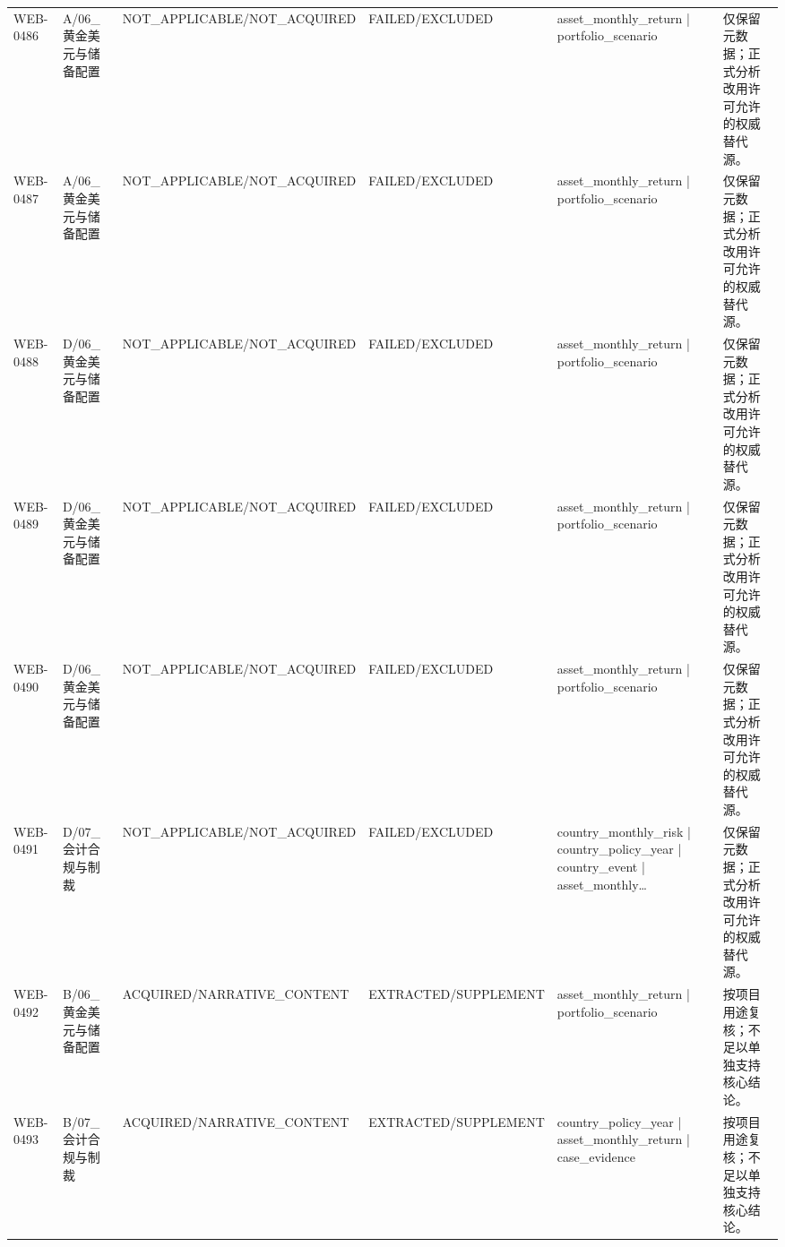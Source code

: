 \begin{landscape}
\begin{longtable}{p{1.8cm}p{2.6cm}p{2.6cm}p{2.6cm}p{4.8cm}p{7.2cm}}
WEB-0486 & A/\allowbreak{}06\_\allowbreak{}黄金美元与储备配置 & NOT\_\allowbreak{}APPLICABLE/\allowbreak{}NOT\_\allowbreak{}ACQUIRED & FAILED/\allowbreak{}EXCLUDED & asset\_\allowbreak{}monthly\_\allowbreak{}return | portfolio\_\allowbreak{}scenario & 仅保留元数据；正式分析改用许可允许的权威替代源。\\
WEB-0487 & A/\allowbreak{}06\_\allowbreak{}黄金美元与储备配置 & NOT\_\allowbreak{}APPLICABLE/\allowbreak{}NOT\_\allowbreak{}ACQUIRED & FAILED/\allowbreak{}EXCLUDED & asset\_\allowbreak{}monthly\_\allowbreak{}return | portfolio\_\allowbreak{}scenario & 仅保留元数据；正式分析改用许可允许的权威替代源。\\
WEB-0488 & D/\allowbreak{}06\_\allowbreak{}黄金美元与储备配置 & NOT\_\allowbreak{}APPLICABLE/\allowbreak{}NOT\_\allowbreak{}ACQUIRED & FAILED/\allowbreak{}EXCLUDED & asset\_\allowbreak{}monthly\_\allowbreak{}return | portfolio\_\allowbreak{}scenario & 仅保留元数据；正式分析改用许可允许的权威替代源。\\
WEB-0489 & D/\allowbreak{}06\_\allowbreak{}黄金美元与储备配置 & NOT\_\allowbreak{}APPLICABLE/\allowbreak{}NOT\_\allowbreak{}ACQUIRED & FAILED/\allowbreak{}EXCLUDED & asset\_\allowbreak{}monthly\_\allowbreak{}return | portfolio\_\allowbreak{}scenario & 仅保留元数据；正式分析改用许可允许的权威替代源。\\
WEB-0490 & D/\allowbreak{}06\_\allowbreak{}黄金美元与储备配置 & NOT\_\allowbreak{}APPLICABLE/\allowbreak{}NOT\_\allowbreak{}ACQUIRED & FAILED/\allowbreak{}EXCLUDED & asset\_\allowbreak{}monthly\_\allowbreak{}return | portfolio\_\allowbreak{}scenario & 仅保留元数据；正式分析改用许可允许的权威替代源。\\
WEB-0491 & D/\allowbreak{}07\_\allowbreak{}会计合规与制裁 & NOT\_\allowbreak{}APPLICABLE/\allowbreak{}NOT\_\allowbreak{}ACQUIRED & FAILED/\allowbreak{}EXCLUDED & country\_\allowbreak{}monthly\_\allowbreak{}risk | country\_\allowbreak{}policy\_\allowbreak{}year | country\_\allowbreak{}event | asset\_\allowbreak{}monthly… & 仅保留元数据；正式分析改用许可允许的权威替代源。\\
WEB-0492 & B/\allowbreak{}06\_\allowbreak{}黄金美元与储备配置 & ACQUIRED/\allowbreak{}NARRATIVE\_\allowbreak{}CONTENT & EXTRACTED/\allowbreak{}SUPPLEMENT & asset\_\allowbreak{}monthly\_\allowbreak{}return | portfolio\_\allowbreak{}scenario & 按项目用途复核；不足以单独支持核心结论。\\
WEB-0493 & B/\allowbreak{}07\_\allowbreak{}会计合规与制裁 & ACQUIRED/\allowbreak{}NARRATIVE\_\allowbreak{}CONTENT & EXTRACTED/\allowbreak{}SUPPLEMENT & country\_\allowbreak{}policy\_\allowbreak{}year | asset\_\allowbreak{}monthly\_\allowbreak{}return | case\_\allowbreak{}evidence & 按项目用途复核；不足以单独支持核心结论。\\

\end{longtable}
\end{landscape}
